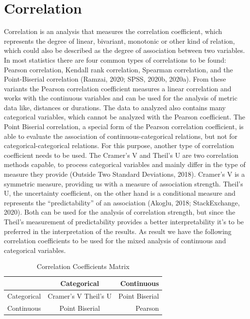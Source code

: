 \documentclass[a4paper,12pt]{report}
\begin{document}
\section{Correlation}
\label{definition_correlation}
Correlation is an analysis that measures the correlation coefficient, which represents the degree of linear, bivariant, monotonic or other kind of relation, which could also be described as the degree of association between two variables. In most statistics there are four common types of correlations to be found: Pearson correlation, Kendall rank correlation, Spearman correlation, and the Point-Biserial correlation (Ramzai, 2020; SPSS, 2020b, 2020a). 
From these variants the Pearson correlation coefficient measures a linear correlation and works with the continuous variables and can be used for the analysis of metric data like, distances or durations. The data to analyzed also contains many categorical variables, which cannot be analyzed with the Pearson coefficient. The Point Biserial correlation, a special form of the Pearson correlation coefficient, is able to evaluate the association of continuous-categorical relations, but not for categorical-categorical relations. For this purpose, another type of correlation coefficient needs to be used. The Cramer’s V and Theil's U are two correlation methods capable, to process categorical variables and mainly differ in the type of measure they provide (Outside Two Standard Deviations, 2018). Cramer’s V is a symmetric measure, providing us with a measure of association strength. Theil's U, the uncertainty coefficient, on the other hand is a conditional measure and represents the “predictability” of an association (Akoglu, 2018; StackExchange, 2020). Both can be used for the analysis of correlation strength, but since the Theil's measurement of predictability provides a better interpretability it’s to be preferred in the interpretation of the results. As result we have the following correlation coefficients to be used for the mixed analysis of continuous and categorical variables.

\begin{table}
	\centering
	\begin{tabular}[h]{l|c|r}
					& Categorical 			& Continuous \\
		\hline
		Categorical & Cramer’s V Theil’s U 	& Point Biserial \\
		\hline
		Continuous 	& Point Biserial 		& Pearson \\
	\end{tabular}
	\caption{\label{tab:table-name}Correlation Coefficients Matrix}
\end{table}
\end{document}
